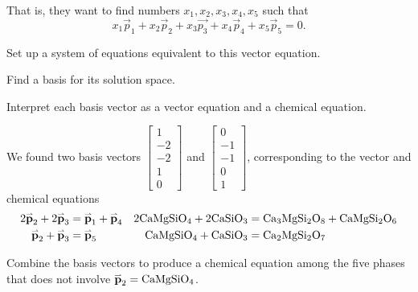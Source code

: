 \begin{applicationActivities}
\begin{activity}{15}
That is, they want to find numbers \(x_1,x_2,x_3,x_4,x_5\) such that 
\[x_1\vec{p}_1+x_2\vec{p}_2+x_3\vec{p_3}+x_4\vec{p}_4+x_5\vec{p}_5 = 0.\]

\begin{subactivity}
Set up a system of equations equivalent to this vector equation.
\end{subactivity}
\begin{subactivity}
Find a basis for its solution space.
\end{subactivity}
\begin{subactivity}
Interpret each basis vector as a vector equation and a chemical equation.
\end{subactivity}

\end{activity}

\begin{activity}{10}
We found two basis vectors 
\(\begin{bmatrix} 1 \\ -2 \\ -2 \\ 1 \\ 0 \end{bmatrix}\) and 
\(\begin{bmatrix} 0 \\ -1 \\ -1 \\ 0 \\ 1 \end{bmatrix}\), 
corresponding to the vector and chemical equations
\begin{align*}
2\vec{p}_2 + 2 \vec{p}_3 &= \vec{p}_1 + \vec{p}_4 & 2{\rm CaMgSiO_4}+2{\rm CaSiO_3}&={\rm Ca_3MgSi_2O_8}+{\rm CaMgSi_2O_6}\\
\vec{p}_2 +\vec{p}_3 &= \vec{p}_5 &  {\rm CaMgSiO_4} + {\rm CaSiO_3} &= {\rm Ca_2MgSi_2O_7}
\end{align*}

Combine the basis vectors to produce a chemical equation among the five phases that does not involve \(\vec{p}_2 = {\rm CaMgSiO_4}\).
\end{activity}




\end{applicationActivities}
